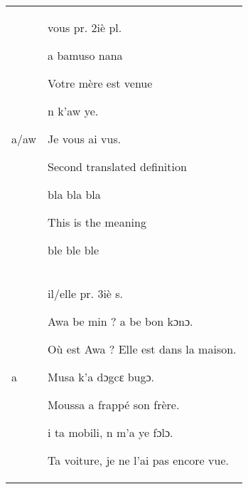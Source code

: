 \documentclass[a4paper,12pt]{article}
\begin{document}
\noindent
\begin{tabularx}{\textwidth}{@{} P{5cm} X @{}}
		a/aw &
\begin{definition}
\item vous pr. 2iè pl. 
  \begin{exemplefr}
  \item a bamuso nana

		Votre mère est venue
  \item n k'aw ye.

  Je vous ai vus.
  \end{exemplefr} 
\item Second translated definition 
  \begin{exemplefr}
  \item bla bla bla

		This is the meaning
  \item ble ble ble 
  \end{exemplefr}
\end{definition} 
\\
a &
\begin{definition}
\item il/elle pr. 3iè s.
	\begin{exemplefr}
	\item Awa be min ? a be bon kɔnɔ.

		Où est Awa ? Elle est dans la maison. 
	\item Musa k'a dɔgcɛ bugɔ.

		Moussa a frappé son frère.
	\item i ta mobili, n m'a ye fɔlɔ.

		Ta voiture, je ne l'ai pas encore vue.  
	\end{exemplefr}
\end{definition}

\end{tabularx}
\end{document}
